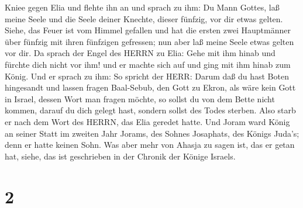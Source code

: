 Kniee gegen Elia und flehte ihn an und sprach zu ihm: Du Mann Gottes,
laß meine Seele und die Seele deiner Knechte, dieser fünfzig, vor dir
etwas gelten.  Siehe, das Feuer ist vom Himmel gefallen und
hat die ersten zwei Hauptmänner über fünfzig mit ihren fünfzigen
gefressen; nun aber laß meine Seele etwas gelten vor dir. 
Da sprach der Engel des HERRN zu Elia: Gehe mit ihm hinab und fürchte
dich nicht vor ihm! und er machte sich auf und ging mit ihm hinab zum
König.  Und er sprach zu ihm: So spricht der HERR: Darum
daß du hast Boten hingesandt und lassen fragen Baal-Sebub, den Gott zu
Ekron, als wäre kein Gott in Israel, dessen Wort man fragen möchte, so
sollst du von dem Bette nicht kommen, darauf du dich gelegt hast,
sondern sollst des Todes sterben.  Also starb er nach dem
Wort des HERRN, das Elia geredet hatte. Und Joram ward König an seiner
Statt im zweiten Jahr Jorams, des Sohnes Josaphats, des Königs Juda's;
denn er hatte keinen Sohn.  Was aber mehr von Ahasja zu
sagen ist, das er getan hat, siehe, das ist geschrieben in der Chronik
der Könige Israels.

\hypertarget{section-1}{%
\section{2}\label{section-1}}

